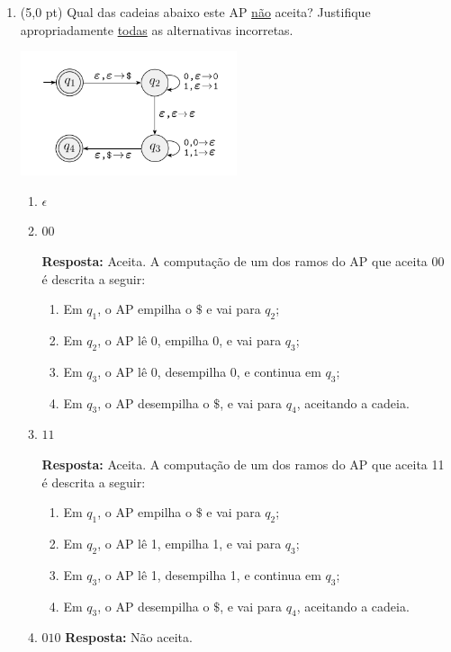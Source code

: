 \documentclass[12pt,a4paper,oneside]{article}
\begin{document}
\begin{enumerate}
	\newpage
	
	\item (5,0 pt) Qual das cadeias abaixo este AP \underline{não} aceita? Justifique apropriadamente \underline{todas} as alternativas incorretas.
	
	\begin{center}
		\includegraphics[width=0.5\textwidth]{images/ap3}
	\end{center}
	
	\begin{enumerate}
		\item $\epsilon$ 
		\item $00$
		
		\vspace*{0.3cm}
		
		{\color{red} {\bf Resposta: } Aceita. A computação de um dos ramos do AP que aceita  00 é descrita a seguir:
			\begin{enumerate}
				\item Em $q_1$, o AP empilha o $\$$ e vai para $q_2$;
				\item Em $q_2$, o AP lê 0, empilha 0, e vai para $q_3$;
				\item Em $q_3$, o AP lê 0, desempilha 0, e continua em $q_3$;
				\item Em $q_3$, o AP desempilha o $\$$, e vai para $q_4$, aceitando a cadeia.		
		\end{enumerate}}
		
		\item $11$
		
		\vspace*{0.3cm}
		
		{\color{red} {\bf Resposta: } Aceita. A computação de um dos ramos do AP que aceita  11 é descrita a seguir:
			\begin{enumerate}
				\item Em $q_1$, o AP empilha o $\$$ e vai para $q_2$;
				\item Em $q_2$, o AP lê 1, empilha 1, e vai para $q_3$;
				\item Em $q_3$, o AP lê 1, desempilha 1, e continua em $q_3$;
				\item Em $q_3$, o AP desempilha o $\$$, e vai para $q_4$, aceitando a cadeia.		
		\end{enumerate}}
		
		\item $010$ \hspace*{0.5cm} {\color{blue} {\bf Resposta: } Não aceita.}
		
	\end{enumerate}
	
\end{enumerate}
\end{document}
